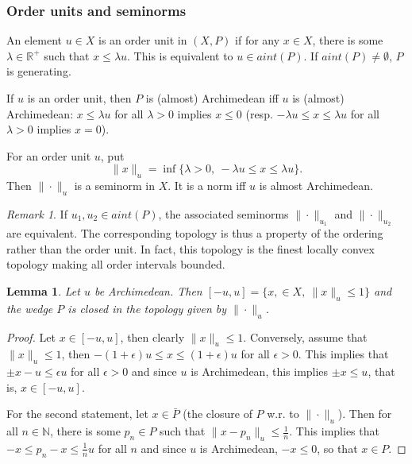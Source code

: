 \documentclass[12pt]{article}
\newtheorem{lemma}{Lemma}
\theoremstyle{remark}
\newtheorem{rem}{Remark}
\newcommand{\<}{\langle}
\begin{document}
\subsubsection*{Order units and seminorms}

 An element $u\in X$ is an order unit in $(X,P)$ if for any $x\in X$, there is some $\lambda\in \mathbb R^+$ such that 
 $x\le \lambda u$. This is equivalent to $u\in aint(P)$. If $aint(P)\ne \emptyset$, $P$ is generating.  

If $u$ is an order unit, then $P$ is (almost) Archimedean iff 
$u$ is (almost) Archimedean: $x\le \lambda u$ for all $\lambda>0$ implies $x\le 0$ (resp. $-\lambda u\le x\le \lambda u$ for all $\lambda>0$ implies $x=0$). 



For an order unit $u$, put
 \[
\|x\|_u=\inf\{\lambda>0,\ -\lambda u\le x\le \lambda u\}.
 \]
Then $\|\cdot\|_u$ is a seminorm in $X$. It is a norm iff  $u$ is almost Archimedean. 

\begin{rem}
If $u_1,u_2\in aint(P)$, the associated seminorms $\|\cdot\|_{u_1}$ and $\|\cdot\|_{u_2}$ are equivalent. The corresponding topology is thus a property of the ordering rather than the order unit. In fact, this topology is the finest locally convex topology 
 making all order intervals bounded.
\end{rem}
 

\begin{lemma}\label{lemma:archimedean} Let $u$ be Archimedean. Then $[-u,u]=\{x,\in X,\ \|x\|_u\le 1\}$ and the wedge $P$ is closed in the topology given by $\|\cdot\|_u$.

\end{lemma}

\begin{proof} Let $x\in [-u,u]$, then clearly $\|x\|_u\le 1$. Conversely, assume that $\|x\|_u\le 1$, then $-(1+\epsilon) u\le x\le (1+\epsilon) u$ for all $\epsilon>0$. 
This implies that $\pm x-u\le \epsilon u$ for all $\epsilon>0$ and since $u$ is Archimedean, this implies $\pm x\le u$, that is, $x\in [-u,u]$.

For the second statement, let $x\in \bar P$ (the closure of $P$ w.r. to $\|\cdot\|_u$). Then for all $n\in \mathbb N$, there is some $p_n\in P$ such that $\|x-p_n\|_u\le \tfrac1n$. This implies that $-x\le p_n-x\le \tfrac 1n u$ for all $n$ and since  $u$ is Archimedean, $-x\le 0$, so that $x\in P$.

\end{proof}
\end{document}

